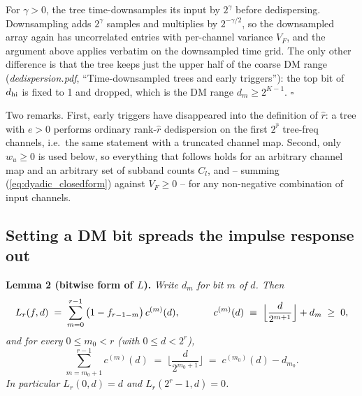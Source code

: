 \documentclass{article}
\numberwithin{equation}{section}   %
\newcommand{\ddnotes}[1]{{\em dedispersion.pdf}, ``#1''}
\begin{document}
For $\gamma>0$, the tree time-downsamples its input by $2^\gamma$ before dedispersing.
Downsampling adds $2^\gamma$ samples and multiplies by $2^{-\gamma/2}$, so the downsampled
array again has uncorrelated entries with per-channel variance $V_F$, and the argument above
applies verbatim on the downsampled time grid. The only other difference is that the tree
keeps just the upper half of the coarse DM range (\ddnotes{Time-downsampled trees and early triggers}): the top bit
of $d_{\rm hi}$ is fixed to 1 and dropped, which is the DM range $d_m \ge 2^{K-1}$. $\square$

\medskip
\par\noindent
Two remarks. First, early triggers have disappeared into the definition of $\hat r$: a tree
with $e>0$ performs ordinary rank-$\hat r$ dedispersion on the first $2^{\hat r}$ tree-freq
channels, i.e.\ the same statement with a truncated channel map. Second, only
$w_u \ge 0$ is used below,
so everything that follows holds for an arbitrary channel map and an arbitrary set of subband
counts $C_l$, and -- summing (\ref{eq:dyadic_closedform}) against $V_F \ge 0$ -- for any
non-negative combination of input channels.

\subsection{Setting a DM bit spreads the impulse response out}
\label{ssec:dyadic_lag}

\par\noindent
{\bf Lemma 2 (bitwise form of $L$).}
{\em Write $d_m$ for bit $m$ of $d$. Then}
\begin{equation}
L_r(f,d) \;=\; \sum_{m=0}^{r-1} \big( 1 - f_{r-1-m} \big) \, c^{(m)}(d),
  \hspace{1.2cm}
c^{(m)}(d) \;\equiv\; \Big\lfloor \frac{d}{2^{m+1}} \Big\rfloor + d_m \;\ge\; 0,
\label{eq:dyadic_bitwise}
\end{equation}
{\em and for every $0 \le m_0 < r$ (with $0 \le d < 2^r$),}
\begin{equation}
\sum_{m=m_0+1}^{r-1} c^{(m)}(d) \;=\; \Big\lfloor \frac{d}{2^{m_0+1}} \Big\rfloor
  \;=\; c^{(m_0)}(d) - d_{m_0}.
\label{eq:dyadic_telescope}
\end{equation}
{\em In particular $L_r(0,d) = d$ and $L_r(2^r-1,d) = 0$.}
\end{document}
